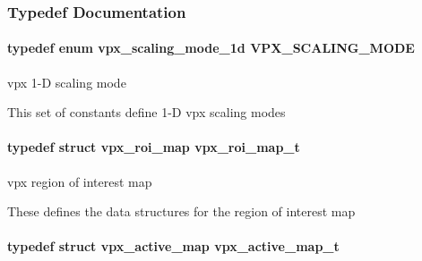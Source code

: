 \subsubsection{\-Typedef \-Documentation}
\hypertarget{group__vp8__encoder_ga100ca891ad96995e61780ae777bf8663}{
\paragraph[{\-V\-P\-X\-\_\-\-S\-C\-A\-L\-I\-N\-G\-\_\-\-M\-O\-D\-E}]{\setlength{\rightskip}{0pt plus 5cm}typedef enum {\bf vpx\-\_\-scaling\-\_\-mode\-\_\-1d}  {\bf \-V\-P\-X\-\_\-\-S\-C\-A\-L\-I\-N\-G\-\_\-\-M\-O\-D\-E}}}
\label{group__vp8__encoder_ga100ca891ad96995e61780ae777bf8663}


vpx 1-\/\-D scaling mode 

\-This set of constants define 1-\/\-D vpx scaling modes \hypertarget{group__vp8__encoder_ga5be1a94d436a5e9296f5be06f57ccbd1}{
\paragraph[{vpx\-\_\-roi\-\_\-map\-\_\-t}]{\setlength{\rightskip}{0pt plus 5cm}typedef struct {\bf vpx\-\_\-roi\-\_\-map}  {\bf vpx\-\_\-roi\-\_\-map\-\_\-t}}}
\label{group__vp8__encoder_ga5be1a94d436a5e9296f5be06f57ccbd1}


vpx region of interest map 

\-These defines the data structures for the region of interest map \hypertarget{group__vp8__encoder_ga7b48f7962f5061979f0f8ece6fb1cba8}{
\paragraph[{vpx\-\_\-active\-\_\-map\-\_\-t}]{\setlength{\rightskip}{0pt plus 5cm}typedef struct {\bf vpx\-\_\-active\-\_\-map}  {\bf vpx\-\_\-active\-\_\-map\-\_\-t}}}
\label{group__vp8__encoder_ga7b48f7962f5061979f0f8ece6fb1cba8}


